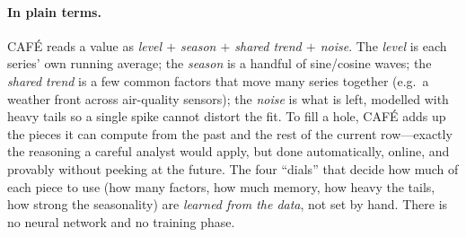 \documentclass[10pt,twocolumn]{article}
\newcommand{\cafe}{CAF\'E}
\begin{document}
\paragraph{In plain terms.} \cafe{} reads a value as
\emph{level $+$ season $+$ shared trend $+$ noise}. The \emph{level} is each
series' own running average; the \emph{season} is a handful of sine/cosine waves;
the \emph{shared trend} is a few common factors that move many series together
(e.g.\ a weather front across air-quality sensors); the \emph{noise} is what is
left, modelled with heavy tails so a single spike cannot distort the fit. To fill
a hole, \cafe{} adds up the pieces it can compute from the past and the rest of
the current row---exactly the reasoning a careful analyst would apply, but done
automatically, online, and provably without peeking at the future. The four
``dials'' that decide how much of each piece to use (how many factors, how much
memory, how heavy the tails, how strong the seasonality) are \emph{learned from
the data}, not set by hand. There is no neural network and no training phase.
\end{document}

